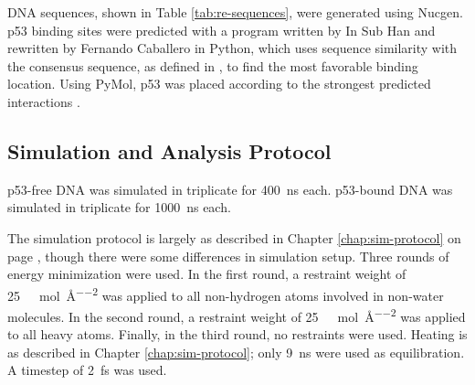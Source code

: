 DNA sequences, shown in Table \ref{tab:re-sequences}, were generated using Nucgen. p53 binding sites were predicted with a program written by In Sub Han \parencite{p53BindingProgram} and rewritten by Fernando Caballero in Python, which uses  sequence similarity with the consensus sequence, as defined in \parencite{el-deiryDefinitionConsensusBinding1992}, to find the most favorable binding location. Using PyMol, p53 was placed according to the strongest predicted interactions \parencite{PyMOL}.

\subsection{Simulation and Analysis Protocol}
\label{chap:short-sim-prep}

p53-free DNA was simulated in triplicate for \qty{400}{\nano\second} each. p53-bound DNA was simulated in triplicate for \qty{1000}{\nano\second} each.

The simulation protocol is largely as described in Chapter \ref{chap:sim-protocol} on page \pageref{chap:sim-protocol}, though there were some differences in simulation setup. Three rounds of energy minimization were used. In the first round, a restraint weight of \qty{25}{\kilo\calorie\per\mol\per\angstrom^{2}} was applied to all non-hydrogen atoms involved in non-water molecules. In the second round, a restraint weight of \qty{25}{\kilo\calorie\per\mol\per\angstrom^{2}} was applied to all heavy atoms. Finally, in the third round, no restraints were used. Heating is as described in Chapter \ref{chap:sim-protocol}; only \qty{9}{\nano\second} were used as equilibration. A timestep of \qty{2}{\femto\second} was used.
